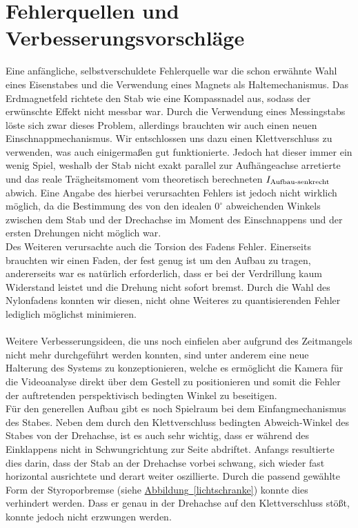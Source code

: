 \documentclass[11pt]{scrartcl}
\newcommand{\hypref}[2]{\hyperref[#2]{{#1}~\ref{#2}}}
\begin{document}
\section{Fehlerquellen und Verbesserungsvorschläge}\label{sec:verbesserung}
Eine anfängliche, selbstverschuldete Fehlerquelle war die schon erwähnte Wahl eines Eisenstabes und die Verwendung eines Magnets als Haltemechanismus. Das Erdmagnetfeld richtete den Stab wie eine Kompassnadel aus, sodass der erwünschte Effekt nicht messbar war. Durch die Verwendung eines Messingstabs löste sich zwar dieses Problem, allerdings brauchten wir auch einen neuen Einschnappmechanismus. Wir entschlossen uns dazu einen Klettverschluss zu verwenden, was auch einigermaßen gut funktionierte. Jedoch hat dieser immer ein wenig Spiel, weshalb der Stab nicht exakt parallel zur Aufhängeachse arretierte und das reale Trägheitsmoment vom theoretisch berechneten $I_{\textnormal{Aufbau-senkrecht}}$ abwich. Eine Angabe des hierbei verursachten Fehlers ist jedoch nicht wirklich möglich, da die Bestimmung des von den idealen $0^\circ$ abweichenden Winkels zwischen dem Stab und der Drechachse im Moment des Einschnappens und der ersten Drehungen nicht möglich war.\\
Des Weiteren verursachte auch die Torsion des Fadens Fehler. Einerseits brauchten wir einen Faden, der fest genug ist um den Aufbau zu tragen, andererseits war es natürlich erforderlich, dass er bei der Verdrillung kaum Widerstand leistet und die Drehung nicht sofort bremst. Durch die Wahl des Nylonfadens konnten wir diesen, nicht ohne Weiteres zu quantisierenden Fehler lediglich möglichst minimieren.\\
\\
Weitere Verbesserungsideen, die uns noch einfielen aber aufgrund des Zeitmangels nicht mehr durchgeführt werden konnten, sind unter anderem eine neue Halterung des Systems zu konzeptionieren, welche es ermöglicht die Kamera für die Videoanalyse direkt über dem Gestell zu positionieren und somit die Fehler der auftretenden perspektivisch bedingten Winkel zu beseitigen.\\
Für den generellen Aufbau gibt es noch Spielraum bei dem Einfangmechanismus des Stabes. Neben dem durch den Klettverschluss bedingten Abweich-Winkel des Stabes von der Drehachse, ist es auch sehr wichtig, dass er während des Einklappens nicht in Schwungrichtung zur Seite abdriftet. Anfangs resultierte dies darin, dass der Stab an der Drehachse vorbei schwang, sich wieder fast horizontal ausrichtete und derart weiter oszillierte. Durch die passend gewählte Form der Styroporbremse (siehe \hypref{Abbildung}{lichtschranke}) konnte dies verhindert werden. Dass er genau in der Drehachse auf den Klettverschluss stößt, konnte jedoch nicht erzwungen werden.\\
\end{document}
